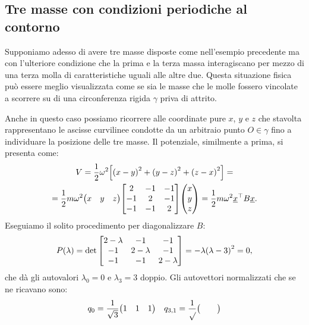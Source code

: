    \subsection{Tre masse con condizioni periodiche al contorno}
        Supponiamo adesso di avere tre masse disposte come nell'esempio precedente ma con l'ulteriore condizione che la prima e la terza massa interagiscano per mezzo di una terza molla di caratteristiche uguali alle altre due. Questa situazione fisica pu\`o essere meglio visualizzata come se sia le masse che le molle fossero vincolate a scorrere su di una circonferenza rigida $\gamma$ priva di attrito. \par Anche in questo caso possiamo ricorrere alle coordinate pure $x$, $y$ e $z$ che stavolta rappresentano le ascisse curvilinee condotte da un arbitraio punto $O\in\gamma$ fino a individuare la posizione delle tre masse. Il potenziale, similmente a prima, si presenta come: 
        \begin{multline*}
            V=\frac{1}{2}\omega^2\qty[\qty(x-y)^2+\qty(y-z)^2+\qty(z-x)^2]=\\=\frac{1}{2}m\omega^2\mqty(x & y & z)\mqty[\dmat[-1]{2,2,2}]\mqty(x \\ y \\ z)=\frac{1}{2}m\omega^2\underline{x}^\top B\underline{x}.
        \end{multline*}
        Eseguiamo il solito procedimento per diagonalizzare $B$: $$P\qty(\lambda)=\det\mqty[\dmat[-1]{2-\lambda,2-\lambda,2-\lambda}]=-\lambda\qty(\lambda-3)^2=0,$$ che d\`a gli autovalori $\lambda_0=0$ e $\lambda_3=3$ doppio. Gli autovettori normalizzati che se ne ricavano sono: $$q_0=\frac{1}{\sqrt{3}}\mqty(1 & 1 & 1)\quad q_{3,1}=\frac{1}{\sqrt{}}\mqty( & & )$$
